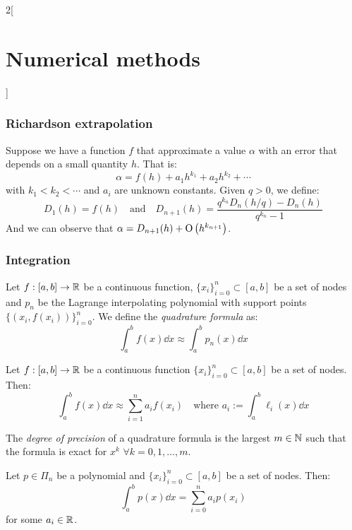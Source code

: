 \documentclass[../../../main_math.tex]{subfiles}
\begin{document}
\begin{multicols}{2}[\section{Numerical methods}]
  \subsubsection{Richardson extrapolation}
  \begin{theorem}
    Suppose we have a function $f$ that approximate a value $\alpha$ with an error that depends on a small quantity $h$. That is: $$\alpha=f(h)+a_1h^{k_1}+a_2h^{k_2}+\cdots$$ with $k_1<k_2<\cdots$ and $a_i$ are unknown constants. Given $q>0$, we define: $$D_1(h)=f(h)\quad\text{and}\quad D_{n+1}(h)=\frac{q^{k_n}D_n\left(h/q\right)-D_n(h)}{q^{k_n}-1}$$ And we can observe that $\alpha=D_{n+1}(h)+\mathrm{O}\left(h^{k_{n+1}}\right)$.
  \end{theorem}
  \subsubsection{Integration}
  \begin{definition}
    Let $f:[a,b]\rightarrow\mathbb{R}$ be a continuous function, $\{x_i\}_{i=0}^n\subset[a,b]$ be a set of nodes and $p_n$ be the Lagrange interpolating polynomial with support points $\{(x_i,f(x_i))\}_{i=0}^n$. We define the \emph{quadrature formula} as: $$\int_a^bf(x)\dd{x}\approx\int_a^bp_n(x)\dd{x}$$
  \end{definition}
  \begin{lemma}
    Let $f:[a,b]\rightarrow\mathbb{R}$ be a continuous function $\{x_i\}_{i=0}^n\subset[a,b]$ be a set of nodes. Then: $$\int_a^bf(x)\dd{x}\approx\sum_{i=1}^na_if(x_i)\quad\text{where }a_i:=\int_a^b\ell_i(x)\dd{x}$$
  \end{lemma}
  \begin{definition}
    The \emph{degree of precision} of a quadrature formula is the largest $m\in\mathbb{N}$ such that the formula is exact for $x^k$ $\forall k=0,1,\ldots,m$.
  \end{definition}
  \begin{lemma}
    Let $p\in\Pi_n$ be a polynomial and $\{x_i\}_{i=0}^n\subset[a,b]$ be a set of nodes. Then: $$\int_a^bp(x)\dd{x}=\sum_{i=0}^na_ip(x_i)$$ for some $a_i\in\mathbb{R}$.
  \end{lemma}

\end{multicols}
\end{document}
